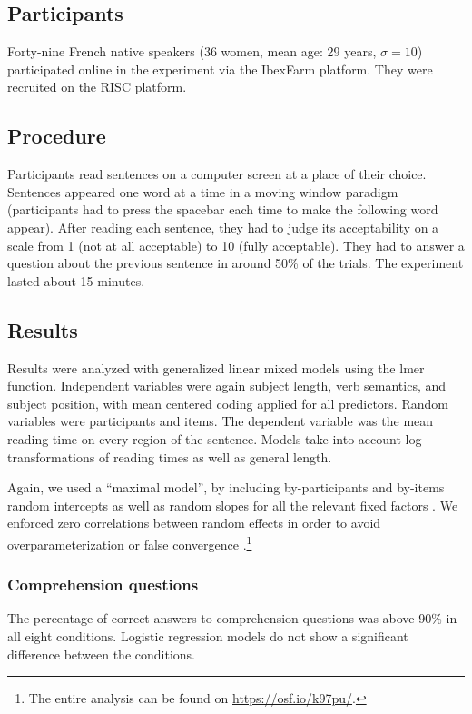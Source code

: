 \documentclass[output=paper]{langscibook}
\begin{document}
\subsection{Participants}
Forty-nine French native speakers (36 women, mean age: 29 years, $\sigma=10$) participated online in the experiment via the IbexFarm platform. They were recruited on the RISC platform.

\subsection{Procedure}
Participants read sentences on a computer screen at a place of their choice. Sentences appeared one word at a time in a moving window paradigm (participants had to press the spacebar each time to make the following word appear). After reading each sentence, they had to judge its acceptability on a scale from 1 (not at all acceptable) to 10 (fully acceptable). They had to answer a question about the previous sentence in around 50\% of the trials. The experiment lasted about 15 minutes.


\subsection{Results}\largerpage[2]
Results were analyzed with generalized linear mixed models using the lmer function. Independent variables were again subject length, verb semantics, and subject position, with mean centered coding applied for all predictors. Random variables were participants and items. The dependent variable was the mean reading time on every region of the sentence. Models take into account log-transforma\-tions of reading times as well as general length. 

Again, we used a ``maximal model'', by including by-participants and by-items random intercepts as well as random slopes for all the relevant fixed factors \citep{barr2013}. We enforced zero correlations between random effects in order to avoid overparameterization or false convergence \citep{Bates2015}.\footnote{The entire analysis can be found on \url{https://osf.io/k97pu/}.} 

\subsubsection{Comprehension questions}
The percentage of correct answers to comprehension questions was above 90\% in all eight conditions. Logistic regression models do not show a significant difference between the conditions.
\end{document}
